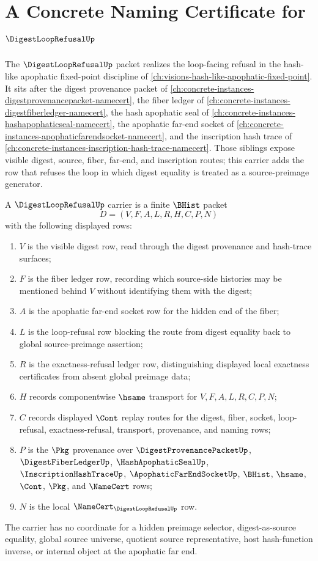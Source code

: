 \chapter{A Concrete Naming Certificate for $\DigestLoopRefusalUp$}
\label{ch:concrete-instances-digest-loop-refusal-namecert}

The $\DigestLoopRefusalUp$ packet realizes the loop-facing refusal in the hash-like apophatic fixed-point discipline of \autoref{ch:visions-hash-like-apophatic-fixed-point}. It sits after the digest provenance packet of \autoref{ch:concrete-instances-digestprovenancepacket-namecert}, the fiber ledger of \autoref{ch:concrete-instances-digestfiberledger-namecert}, the hash apophatic seal of \autoref{ch:concrete-instances-hashapophaticseal-namecert}, the apophatic far-end socket of \autoref{ch:concrete-instances-apophaticfarendsocket-namecert}, and the inscription hash trace of \autoref{ch:concrete-instances-inscription-hash-trace-namecert}. Those siblings expose visible digest, source, fiber, far-end, and inscription routes; this carrier adds the row that refuses the loop in which digest equality is treated as a source-preimage generator.

\begin{definition}
\label{def:digest-loop-refusal-carrier}
A $\DigestLoopRefusalUp$ carrier is a finite $\BHist$ packet
$$
D=(V,F,A,L,R,H,C,P,N)
$$
with the following displayed rows:
\begin{enumerate}
\item $V$ is the visible digest row, read through the digest provenance and hash-trace surfaces;
\item $F$ is the fiber ledger row, recording which source-side histories may be mentioned behind $V$ without identifying them with the digest;
\item $A$ is the apophatic far-end socket row for the hidden end of the fiber;
\item $L$ is the loop-refusal row blocking the route from digest equality back to global source-preimage assertion;
\item $R$ is the exactness-refusal ledger row, distinguishing displayed local exactness certificates from absent global preimage data;
\item $H$ records componentwise $\hsame$ transport for $V,F,A,L,R,C,P,N$;
\item $C$ records displayed $\Cont$ replay routes for the digest, fiber, socket, loop-refusal, exactness-refusal, transport, provenance, and naming rows;
\item $P$ is the $\Pkg$ provenance over $\DigestProvenancePacketUp$, $\DigestFiberLedgerUp$, $\HashApophaticSealUp$, $\InscriptionHashTraceUp$, $\ApophaticFarEndSocketUp$, $\BHist$, $\hsame$, $\Cont$, $\Pkg$, and $\NameCert$ rows;
\item $N$ is the local $\NameCert_{\DigestLoopRefusalUp}$ row.
\end{enumerate}
The carrier has no coordinate for a hidden preimage selector, digest-as-source equality, global source universe, quotient source representative, host hash-function inverse, or internal object at the apophatic far end.
\end{definition}

